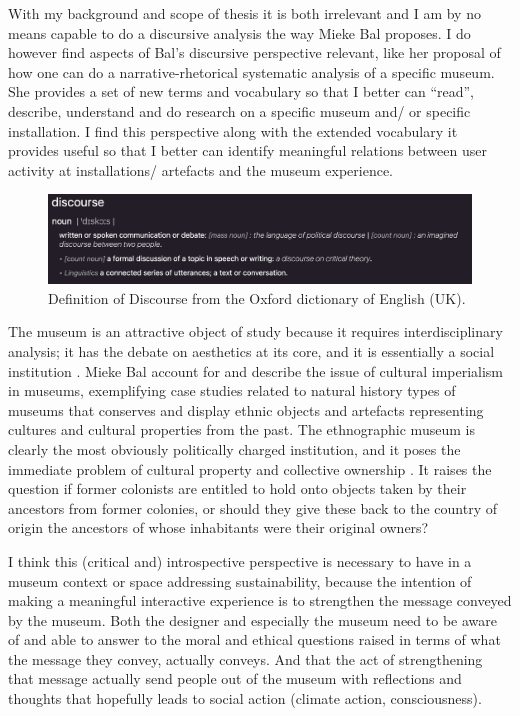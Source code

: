 With my background and scope of thesis it is both irrelevant and I am by no means capable to do a discursive analysis the way Mieke Bal proposes. I do however find aspects of Bal’s discursive perspective relevant, like her proposal of how one can do a narrative-rhetorical systematic analysis of a specific museum. She provides a set of new terms and vocabulary so that I better can “read”, describe, understand and do research on a specific museum and/ or specific installation. I find this perspective along with the extended vocabulary it provides useful so that I better can identify meaningful relations between user activity at installations/ artefacts and the museum experience.

\begin{figure}[H]
\includegraphics[width=12.5cm]{pictures/background/discourse.png}
\caption{Definition of Discourse from the Oxford dictionary of English (UK).}
\centering
\end{figure}

The museum is an attractive object of study because it requires interdisciplinary analysis; it has the debate on aesthetics at its core, and it is essentially a social institution \autocite[p. 202]{Thi_book}. %
Mieke Bal account for and describe the issue of cultural imperialism in museums, exemplifying case studies related to natural history types of museums that conserves and display ethnic objects and artefacts representing cultures and cultural properties from the past. The ethnographic museum is clearly the most obviously politically charged institution, and it poses the immediate problem of cultural property and collective ownership \autocite[p. 202]{Thi_book}. It raises the question if former colonists are entitled to hold onto objects taken by their ancestors from former colonies, or should they give these back to the country of origin the ancestors of whose inhabitants were their original owners? %

I think this (critical and) introspective perspective is necessary to have in a museum context or space addressing sustainability, because the intention of making a meaningful interactive experience is to strengthen the message conveyed by the museum. Both the designer and especially the museum need to be aware of and able to answer to the moral and ethical questions raised in terms of what the message they convey, actually conveys. And that the act of strengthening that message actually send people out of the museum with reflections and thoughts that hopefully leads to social action (climate action, consciousness). %

